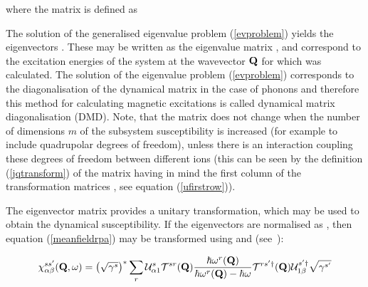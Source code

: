 \noindent where the matrix \hili{$\M{\Lambda}$} is defined as


The solution of the generalised eigenvalue problem (\ref{evproblem}) yields
the eigenvectors .
These may be written as the eigenvalue matrix 
, and correspond %
to the excitation energies of the system at the wavevector
 ${\bf Q}$ for which  was calculated.
The solution of the eigenvalue problem (\ref{evproblem}) corresponds to the %
diagonalisation of the dynamical matrix in the case of phonons and therefore this method for calculating magnetic %
excitations is called dynamical matrix diagonalisation (DMD).
 Note, that the matrix  does not change
when the number of dimensions $m$ of the subsystem susceptibility is increased (for example to include quadrupolar degrees %
of freedom), unless there is an interaction coupling these degrees of freedom between different ions (this can be seen %
by the definition (\ref{jqtransform}) of the matrix 
 having in mind the first column of the %
transformation
matrices , see equation (\ref{ufirstrow})).

The eigenvector matrix  provides a 
unitary transformation, which may be used to obtain the
 dynamical susceptibility. 
If the eigenvectors are normalised as
, then
equation (\ref{meanfieldrpa}) may be transformed using 
 and (see~\cite{rotter12-213201}):

\begin{equation}\label{dmdfinal}
\chi^{ss'}_{\alpha\beta}(\mbf Q,\omega)=\left (\sqrt{\gamma^{s}} \right )^\ast \sum_r
\mathcal U^s_{\alpha1} \hili{\mathcal T^{sr}(\mbf Q) \frac{\hbar \omega^r(\mbf Q)}{\hbar \omega^r(\mbf Q) %
- \hbar \omega} \mathcal T^{rs'\dag}(\mbf Q)} \mathcal U^{s'\dag}_{1\beta}\sqrt{\gamma^{s'}}
\end{equation}

